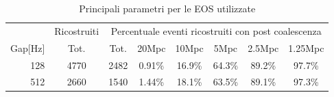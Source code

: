 \begin{table}[hbt!]
	\centering
	\begin{tabular}{rccccccc}
		\toprule
		&\multicolumn{1}{c}{Ricostruiti}	&\multicolumn{6}{c}{Percentuale eventi ricostruiti con post coalescenza}\\
		Gap[Hz]	&Tot. &Tot. &20Mpc	&10Mpc	&5Mpc	&2.5Mpc	&1.25Mpc\\
		\midrule
		128	&4770	&2482	&0.91\%	&16.9\%	&64.3\%	&89.2\%	&97.7\%\\
		512	&2660	&1540	&1.44\% &18.1\%	&63.5\%	&89.1\%	&97.3\%\\
		\bottomrule
	\end{tabular}
	\caption{Principali parametri per le EOS utilizzate}
	\label{tab:ricostruiti_pm_ora}
\end{table}
